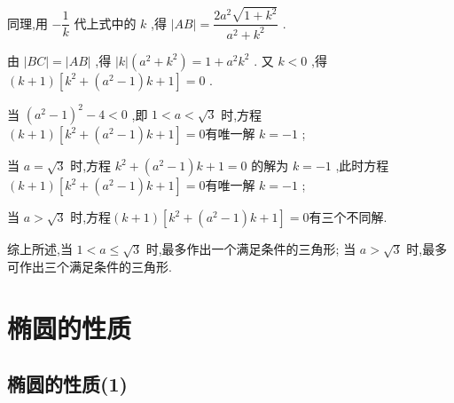\begin{enumerate}
\begin{jieda}
        同理,用 $- \dfrac{1}{k}$ 代上式中的 $k$ ,得 $\left| {AB}\right|  = \dfrac{2{a}^{2}\sqrt{1 + {k}^{2}}}{{a}^{2} + {k}^{2}}$ .
        
        由 $\left| {BC}\right|  = \left| {AB}\right|$ ,得 $\left| k\right| \left( {{a}^{2} + {k}^{2}}\right)  = 1 + {a}^{2}{k}^{2}$ . 又 $k < 0$ ,得 $\left( {k + 1}\right) \left\lbrack  {{k}^{2} + \left( {{a}^{2} - 1}\right) k}+1\right\rbrack  = 0$ . 
        
        当 ${\left( {a}^{2} - 1\right) }^{2} - 4 < 0$ ,即 $1 < a < \sqrt{3}$ 时,方程$\left( {k + 1}\right) \left\lbrack  {{k}^{2} + \left( {{a}^{2} - 1}\right) k}+1\right\rbrack  = 0$有唯一解 $k =  - 1$ ; 
        
        当 $a = \sqrt{3}$ 时,方程 ${k}^{2} + \left( {{a}^{2} - 1}\right) k + 1 = 0$ 的解为 $k =  - 1$ ,此时方程$\left( {k + 1}\right) \left\lbrack  {{k}^{2} + \left( {{a}^{2} - 1}\right) k}+1\right\rbrack  = 0$有唯一解 $k =  - 1$ ; 
        
        当 $a > \sqrt{3}$ 时,方程$\left( {k + 1}\right) \left\lbrack  {{k}^{2} + \left( {{a}^{2} - 1}\right) k}+1\right\rbrack  = 0$有三个不同解. 
        
        综上所述,当 $1 < a \leq  \sqrt{3}$ 时,最多作出一个满足条件的三角形; 当 $a > \sqrt{3}$ 时,最多可作出三个满足条件的三角形.
    \end{jieda}

\end{enumerate}


\section*{椭圆的性质}
\subsection*{椭圆的性质(1)}

